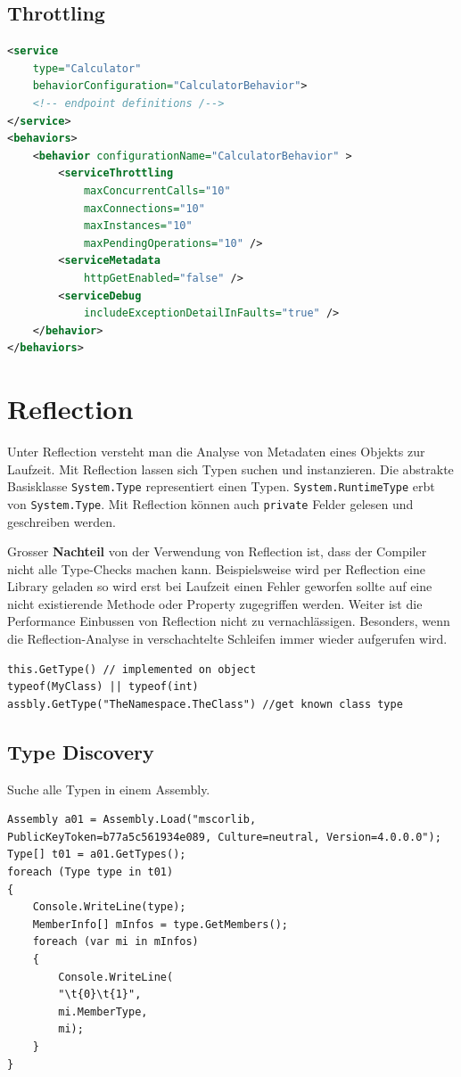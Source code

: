 \subsection{Throttling}
\begin{lstlisting}[caption=Service Throttling, language=XML]
<service
	type="Calculator"
	behaviorConfiguration="CalculatorBehavior">
	<!-- endpoint definitions /-->
</service>
<behaviors>
	<behavior configurationName="CalculatorBehavior" >
		<serviceThrottling
			maxConcurrentCalls="10"
			maxConnections="10"
			maxInstances="10"
			maxPendingOperations="10" />
		<serviceMetadata
			httpGetEnabled="false" />
		<serviceDebug
			includeExceptionDetailInFaults="true" />
	</behavior>
</behaviors>
\end{lstlisting}

\section{Reflection}
Unter Reflection versteht man die Analyse von Metadaten eines Objekts zur Laufzeit. Mit Reflection lassen sich Typen suchen und instanzieren. Die abstrakte Basisklasse \lstinline|System.Type| representiert einen Typen. \lstinline|System.RuntimeType| erbt von \lstinline|System.Type|. Mit Reflection können auch \lstinline|private| Felder gelesen und geschreiben werden.

Grosser \textbf{Nachteil} von der Verwendung von Reflection ist, dass der Compiler nicht alle Type-Checks machen kann. Beispielsweise wird per Reflection eine Library geladen so wird erst bei Laufzeit einen Fehler geworfen sollte auf eine nicht existierende Methode oder Property zugegriffen werden. Weiter ist die Performance Einbussen von Reflection nicht zu vernachlässigen. Besonders, wenn die Reflection-Analyse in verschachtelte Schleifen immer wieder aufgerufen wird.

\begin{lstlisting}[caption=Reflection]
this.GetType() // implemented on object
typeof(MyClass) || typeof(int)
assbly.GetType("TheNamespace.TheClass") //get known class type
\end{lstlisting}

\subsection{Type Discovery}
Suche alle Typen in einem Assembly.
\begin{lstlisting}[caption=Reflection: Type Discovery]
Assembly a01 = Assembly.Load("mscorlib, PublicKeyToken=b77a5c561934e089, Culture=neutral, Version=4.0.0.0");
Type[] t01 = a01.GetTypes();
foreach (Type type in t01)
{
	Console.WriteLine(type);
	MemberInfo[] mInfos = type.GetMembers();
	foreach (var mi in mInfos)
	{
		Console.WriteLine(
		"\t{0}\t{1}",
		mi.MemberType,
		mi);
	}
}
\end{lstlisting}



